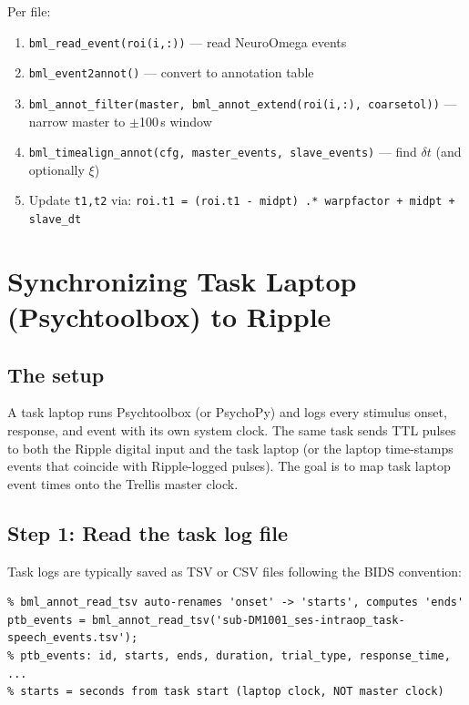 \documentclass[11pt, a4paper]{article}
\begin{document}
Per file:
\begin{enumerate}
  \item \texttt{bml\_read\_event(roi(i,:))} --- read NeuroOmega events
  \item \texttt{bml\_event2annot()} --- convert to annotation table
  \item \texttt{bml\_annot\_filter(master, bml\_annot\_extend(roi(i,:), coarsetol))} --- narrow master to $\pm$100\,s window
  \item \texttt{bml\_timealign\_annot(cfg, master\_events, slave\_events)} --- find $\delta t$ (and optionally $\xi$)
  \item Update \texttt{t1,t2} via: \texttt{roi.t1 = (roi.t1 - midpt) .* warpfactor + midpt + slave\_dt}
\end{enumerate}

\section{Synchronizing Task Laptop (Psychtoolbox) to Ripple}
\label{sec:ptb}

\subsection{The setup}

A task laptop runs Psychtoolbox (or PsychoPy) and logs every stimulus onset, response, and event with its own system clock. The same task sends TTL pulses to both the Ripple digital input and the task laptop (or the laptop time-stamps events that coincide with Ripple-logged pulses). The goal is to map task laptop event times onto the Trellis master clock.

\subsection{Step 1: Read the task log file}

Task logs are typically saved as TSV or CSV files following the BIDS convention:

\begin{lstlisting}[style=matlab, caption={Reading a Psychtoolbox / BIDS event log}]
% BIDS TSV format: columns 'onset' and 'duration' (both in seconds from task start)
% bml_annot_read_tsv auto-renames 'onset' -> 'starts', computes 'ends'
ptb_events = bml_annot_read_tsv('sub-DM1001_ses-intraop_task-speech_events.tsv');
% ptb_events: id, starts, ends, duration, trial_type, response_time, ...
% starts = seconds from task start (laptop clock, NOT master clock)
\end{lstlisting}
\end{document}

